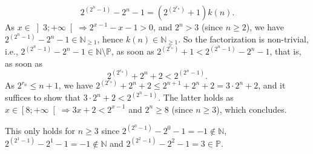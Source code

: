 \begin{solution}
    \[
        2^{\left(2^n-1\right)}-2^n-1 = \left(2^{\left(2^{r_n}\right)}+1\right)k\left(n\right).
    \]
    As \( x \in \left]3;+\infty\right[ \Rightarrow 2^{x-1}-x-1 > 0 \), and \( 2^n > 3 \) (since \( n \geq 2 \)), we have \( 2^{\left(2^n-1\right)}-2^n-1 \in \mathbb{N}_{\geq 1} \), hence \( k\left(n\right) \in \mathbb{N}_{\geq 1} \). So the factorization is non-trivial, i.e., \( 2^{\left(2^n-1\right)}-2^n-1 \in \mathbb{N} \setminus \mathbb{P} \), as soon as \( 2^{\left(2^{r_n}\right)}+1 < 2^{\left(2^n-1\right)}-2^n-1 \), that is, as soon as
    \[
        2^{\left(2^{r_n}\right)}+2^n+2 < 2^{\left(2^n-1\right)}.
    \]
    As \( 2^{r_n} \leq n+1 \), we have \( 2^{\left(2^{r_n}\right)}+2^n+2 \leq 2^{n+1}+2^n+2 = 3 \cdot 2^n+2 \), and it suffices to show that \( 3 \cdot 2^n+2 < 2^{\left(2^n-1\right)} \). The latter holds as \( x \in \left[8;+\infty\right[ \Rightarrow 3x+2 < 2^{x-1} \) and \( 2^n \geq 8 \) (since \( n \geq 3 \)), which concludes.
    \begin{remark}
        This only holds for \( n \geq 3 \) since \( 2^{\left(2^0-1\right)}-2^0-1 = -1 \notin \mathbb{N} \), \( 2^{\left(2^1-1\right)}-2^1-1 = -1 \notin \mathbb{N} \) and \( 2^{\left(2^2-1\right)}-2^2-1 = 3 \in \mathbb{P} \).
    \end{remark}
\end{solution}
